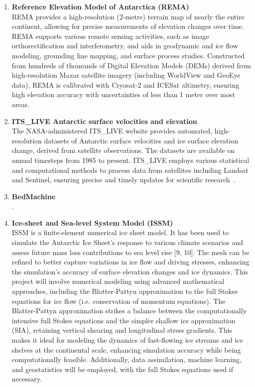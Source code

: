 \begin{enumerate}
    \item\textbf{Reference Elevation Model of Antarctica (REMA)}\\
    REMA provides a high-resolution (2-metre) terrain map of nearly the entire continent, allowing for precise measurements of elevation changes over time. REMA supports various remote sensing activities, such as image orthorectification and interferometry, and aids in geodynamic and ice flow modeling, grounding line mapping, and surface process studies. Constructed from hundreds of thousands of Digital Elevation Models (DEMs) derived from high-resolution Maxar satellite imagery (including WorldView and GeoEye data), REMA is calibrated with Cryosat-2 and ICESat altimetry, ensuring high elevation accuracy with uncertainties of less than 1 meter over most areas\cite{REMA}.

    \item\textbf{ITS\_LIVE Antarctic surface velocities and elevation}\\
    The NASA-administered ITS\_LIVE website provides automated, high-resolution datasets of Antarctic surface velocities and ice surface elevation change, derived from satellite observations. The datasets are available on annual timesteps from 1985 to present. ITS\_LIVE employs various statistical and computational methods to process data from satellites including Landsat and Sentinel, ensuring precise and timely updates for scientific research~\cite{itslive}.

    \item\textbf{BedMachine}\\
    \cite{Fremand_2023}.

    \item\textbf{Ice-sheet and Sea-level System Model (ISSM)}~\cite{ISSM}\\
    ISSM is a finite-element numerical ice sheet model. It has been used to simulate the Antarctic Ice Sheet’s response to various climate scenarios and assess future mass loss contributions to sea level rise [9, 10]. The mesh can be refined to better capture variations in ice flow and driving stresses, enhancing the simulation’s accuracy of surface elevation changes and ice dynamics. This project will involve numerical modeling using advanced mathematical approaches, including the Blatter-Pattyn approximation to the full Stokes equations for ice flow (i.e. conservation of momentum equations). The Blatter-Pattyn approximation strikes a balance between the computationally intensive full Stokes equations and the simpler shallow ice approximation (SIA), retaining vertical shearing and longitudinal stress gradients. This makes it ideal for modeling the dynamics of fast-flowing ice streams and ice shelves at the continental scale, enhancing simulation accuracy while being computationally feasible. Additionally, data assimilation, machine learning, and geostatistics will be employed, with the full Stokes equations used if necessary.
\end{enumerate}


